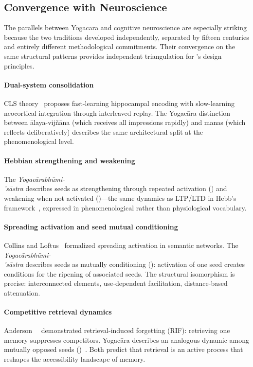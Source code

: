 \subsection{Convergence with Neuroscience}

The parallels between Yogac\=ara and cognitive neuroscience are
especially striking because the two traditions developed independently,
separated by fifteen centuries and entirely different methodological
commitments.  Their convergence on the same structural patterns provides
independent triangulation for \alaya{}'s design principles.

\paragraph{Dual-system consolidation}
CLS theory~\cite{mcclelland1995} proposes fast-learning hippocampal
encoding with slow-learning neocortical integration through interleaved
replay.  The Yogac\=ara distinction between \=alaya-vij\~n\=ana (which
receives all impressions rapidly) and manas (which reflects
deliberatively) describes the same architectural split at the
phenomenological level.

\paragraph{Hebbian strengthening and weakening}
The \emph{Yogac\=arabh\=umi-\\'s\=astra} describes seeds as
strengthening through repeated activation () and weakening
when not activated ()---the same dynamics as LTP/LTD in
Hebb's framework~\cite{hebb1949, bliss1973}, expressed in
phenomenological rather than physiological vocabulary.

\paragraph{Spreading activation and seed mutual conditioning}
Collins and Loftus~\cite{collins1975} formalized spreading activation in
semantic networks.  The \emph{Yogac\=arabh\=umi-\\'s\=astra} describes
seeds as mutually conditioning (): activation of one seed
creates conditions for the ripening of associated seeds.  The structural
isomorphism is precise: interconnected elements, use-dependent
facilitation, distance-based attenuation.

\paragraph{Competitive retrieval dynamics}
Anderson~\etal~\cite{anderson1994} demonstrated retrieval-induced
forgetting (RIF): retrieving one memory suppresses competitors.
Yogac\=ara describes an analogous dynamic among mutually opposed seeds
()~\cite{chengweishilun}.  Both predict that retrieval is
an active process that reshapes the accessibility landscape of memory.

